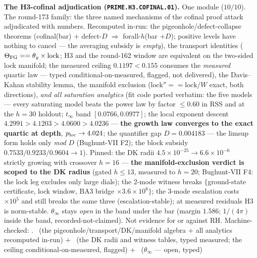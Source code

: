 \par\smallskip\noindent\textbf{The H3-cofinal adjudication
(\texttt{PRIME.\allowbreak H3.\allowbreak COFINAL.01}).}
One module ($10/10$).  The round-173 family: the three named
mechanisms of the cofinal proof attack adjudicated with numbers.
Recomputed in-run: the pigeonhole/defect-collapse theorems
(cofinal(bar) $+$ defect-$D$ $\Rightarrow$ forall-$h$(bar $+
D$); positive levels have nothing to cancel --- the averaging
subsidy is \emph{empty}), the transport identities ($\Theta_{\rm
FG} == \theta_y \times \mathrm{lock}$; H3 and the round-162
window are equivalent on the two-sided lock manifold; the
measured ceiling $0.1197 < 0.155$ consumes the
 \emph{measured}
quartic law --- typed conditional-on-measured, flagged, not
delivered), the Davis--Kahan stability lemma, the manifold
exclusion ($\mathrm{lock}'' == \mathrm{lock}/W$ exact, both
directions), \emph{and all saturation analytics} (fit code
ported verbatim: the five models --- every saturating model
beats the power law by factor $\le 0.60$ in RSS and at the
$h = 30$ holdout; $t_\infty$ band $[0.0766, 0.0977]$; the local
exponent descent $4.2991 > 4.1203 > 4.0600 > 4.0236$ ---
\textbf{the growth law converges to the exact quartic at depth},
$p_{\rm loc} \to 4.024$; the quantifier gap $D = 0.004183$ ---
the limsup form holds only \emph{mod} $D$ (Bughunt-VII F2); the
block subsidy $0.7533/0.9233/0.9604 \to 1$).  Pinned: the DK
radii $4.5\times10^{-25} \to 6.6\times10^{-6}$ strictly growing
with crossover $h = 16$ --- \textbf{the manifold-exclusion
verdict is scoped to the DK radius} (gated $h \le 13$, measured
to $h = 20$; Bughunt-VII F4: the lock leg excludes only large
dials); the 2-mode witness breaks $\{$ground-state certificate,
lock window, BA3 bridge $\times 3.6\times10^{8}\}$; the 3-mode
escalation costs $\times 10^{5}$ and still breaks the same three
(escalation-stable); at measured residuals H3 is norm-stable.
$\theta_\infty$ stays \emph{open} in the band under the bar
(margin $1.586$; $1/(4\pi)$ inside the band,
recorded-not-claimed).  Not evidence for or against RH.
Machine-checked: .
\mE\ (the pigeonhole/transport/DK/manifold algebra $+$ all
analytics recomputed in-run) $+$ \mC\ (the DK radii and witness
tables, typed measured; the ceiling conditional-on-measured,
flagged) $+$ \mO\ ($\theta_\infty$ --- open, typed)
\par\smallskip


